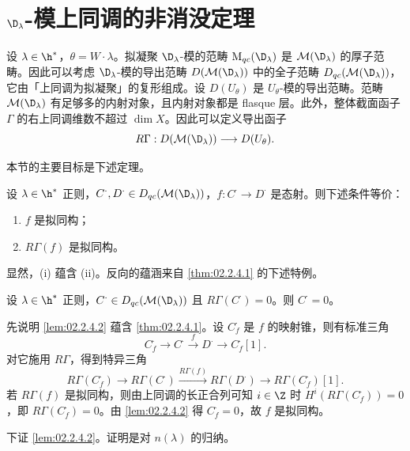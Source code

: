 \section{$\D_\lambda$-模上同调的非消没定理}
\label{sec:02.2.4}

设 $\lambda\in\h^*$，$\theta=W\cdot\lambda$。拟凝聚 $\D_\lambda$-模的范畴 $\mathrm{M}_{qc}(\D_\lambda)$ 是 $\mathcal{M}(\D_\lambda)$ 的厚子范畴。因此可以考虑 $\D_\lambda$-模的导出范畴 $D(\mathcal{M}(\D_\lambda))$ 中的全子范畴 $D_{qc}(\mathcal{M}(\D_\lambda))$，它由「上同调为拟凝聚」的复形组成。设 $D(U_\theta)$ 是 $U_\theta$-模的导出范畴。范畴 $\mathcal{M}(\D_\lambda)$ 有足够多的内射对象，且内射对象都是 flasque 层。此外，整体截面函子 $\Gamma$ 的右上同调维数不超过 $\dim X$。因此可以定义导出函子
\[
R\Gamma:D(\mathcal{M}(\D_\lambda))\longrightarrow D(U_\theta).
\]

本节的主要目标是下述定理。

\begin{theorem}\label{thm:02.2.4.1}
设 $\lambda\in\h^*$ 正则，$C^\cdot,D^\cdot\in D_{qc}(\mathcal{M}(\D_\lambda))$，$f:C^\cdot\to D^\cdot$ 是态射。则下述条件等价：
\begin{enumerate}[label=(\roman*)]
  \item $f$ 是拟同构；
  \item $R\Gamma(f)$ 是拟同构。
\end{enumerate}
\end{theorem}

显然，(i) 蕴含 (ii)。反向的蕴涵来自 \ref{thm:02.2.4.1} 的下述特例。

\begin{lemma}\label{lem:02.2.4.2}
设 $\lambda\in\h^*$ 正则，$C^\cdot\in D_{qc}(\mathcal{M}(\D_\lambda))$ 且 $R\Gamma(C^\cdot)=0$。则 $C^\cdot=0$。
\end{lemma}

先说明 \ref{lem:02.2.4.2} 蕴含 \ref{thm:02.2.4.1}。设 $C^\cdot_f$ 是 $f$ 的映射锥，则有标准三角
\[
C^\cdot_f\longrightarrow C^\cdot\xrightarrow{\ f\ }D^\cdot\longrightarrow C^\cdot_f[1].
\]
对它施用 $R\Gamma$，得到特异三角
\[
R\Gamma(C^\cdot_f)\longrightarrow R\Gamma(C^\cdot)\xrightarrow{R\Gamma(f)}R\Gamma(D^\cdot)\longrightarrow R\Gamma(C^\cdot_f)[1].
\]
若 $R\Gamma(f)$ 是拟同构，则由上同调的长正合列可知 $i\in\Z$ 时 $H^i(R\Gamma(C^\cdot_f))=0$，即 $R\Gamma(C^\cdot_f)=0$。由 \ref{lem:02.2.4.2} 得 $C^\cdot_f=0$，故 $f$ 是拟同构。

下证 \ref{lem:02.2.4.2}。证明是对 $n(\lambda)$ 的归纳。

